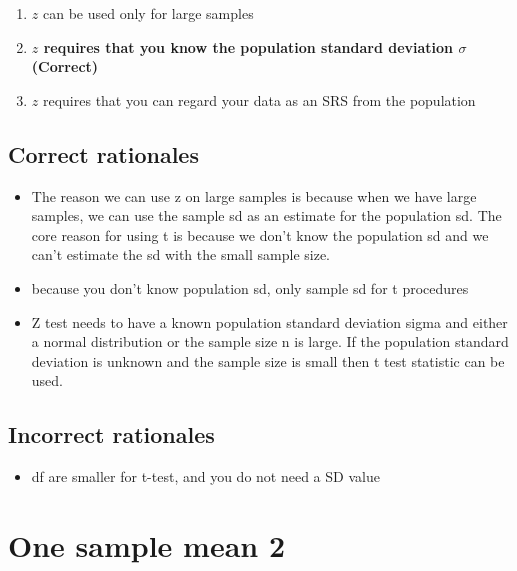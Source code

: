 \documentclass[letterpaper,9pt,twoside,printwatermark=false]{pinp}
\providecommand{\tightlist}{%
  \setlength{\itemsep}{0pt}\setlength{\parskip}{0pt}}
\begin{document}
\begin{enumerate}
\def\labelenumi{\alph{enumi}.}
\tightlist
\item
  \(z\) can be used only for large samples
\item
  \textbf{\(z\) requires that you know the population standard deviation
  \(\sigma\) (Correct)}
\item
  \(z\) requires that you can regard your data as an SRS from the
  population
\end{enumerate}

\hypertarget{correct-rationales-4}{%
\subsection{Correct rationales}\label{correct-rationales-4}}

\begin{itemize}
\tightlist
\item
  The reason we can use z on large samples is because when we have large
  samples, we can use the sample sd as an estimate for the population
  sd. The core reason for using t is because we don't know the
  population sd and we can't estimate the sd with the small sample size.
\item
  because you don't know population sd, only sample sd for t procedures
\item
  Z test needs to have a known population standard deviation sigma and
  either a normal distribution or the sample size n is large. If the
  population standard deviation is unknown and the sample size is small
  then t test statistic can be used.
\end{itemize}

\hypertarget{incorrect-rationales-4}{%
\subsection{Incorrect rationales}\label{incorrect-rationales-4}}

\begin{itemize}
\tightlist
\item
  df are smaller for t-test, and you do not need a SD value
\end{itemize}

\hypertarget{one-sample-mean-2}{%
\section{One sample mean 2}\label{one-sample-mean-2}}
\end{document}
